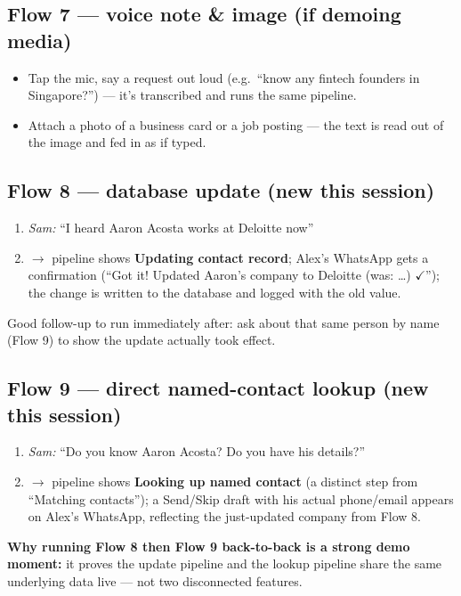 \documentclass[11pt, a4paper]{article}
\begin{document}
\subsection{Flow 7 --- voice note \& image (if demoing media)}
\begin{itemize}
    \item Tap the mic, say a request out loud (e.g.\ ``know any fintech founders in Singapore?'') --- it's transcribed and runs the same pipeline.
    \item Attach a photo of a business card or a job posting --- the text is read out of the image and fed in as if typed.
\end{itemize}

\subsection{Flow 8 --- database update (new this session)}
\begin{enumerate}
    \item \emph{Sam:} ``I heard Aaron Acosta works at Deloitte now''
    \item[] $\rightarrow$ pipeline shows \textbf{Updating contact record}; Alex's WhatsApp gets a confirmation (``Got it! Updated Aaron's company to Deloitte (was: \ldots) $\checkmark$''); the change is written to the database and logged with the old value.
\end{enumerate}
Good follow-up to run immediately after: ask about that same person by name (Flow 9) to show the update actually took effect.

\subsection{Flow 9 --- direct named-contact lookup (new this session)}
\begin{enumerate}
    \item \emph{Sam:} ``Do you know Aaron Acosta? Do you have his details?''
    \item[] $\rightarrow$ pipeline shows \textbf{Looking up named contact} (a distinct step from ``Matching contacts''); a Send/Skip draft with his actual phone/email appears on Alex's WhatsApp, reflecting the just-updated company from Flow 8.
\end{enumerate}
\textbf{Why running Flow 8 then Flow 9 back-to-back is a strong demo moment:} it proves the update pipeline and the lookup pipeline share the same underlying data live --- not two disconnected features.
\end{document}
